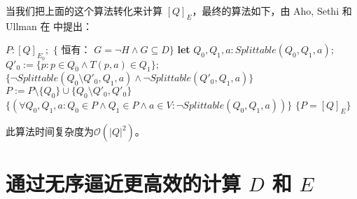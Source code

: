 当我们把上面的这个算法转化来计算 $[Q]_E$，最终的算法如下，由 Aho, Sethi 和 Ullman 在 \cite[Alg.3.6]{ASU86} 中提出：
\begin{algorithm}
    \caption{}\label{al:4-4}
    \begin{algorithmic}[1]
        \State $P:[Q]_{E_0};$ 
        \State $\{$ 恒有： $G= \neg H \land G \subseteq D \} $
            \State \textbf{let} $Q_0,Q_1,a:Splittable(Q_0,Q_1,a);$
            \State  $Q'_0 := \{ p:p\in Q_0 \land T(p,a) \in Q_1 \};$
            \State  $\{ \neg Splittable (Q_0 \setminus Q'_0 ,Q_1 ,a ) \land \neg Splittable (Q'_0,Q_1,a) \}$
            \State  $P := P \setminus \{Q_0\} \cup \{Q_0 \setminus Q'_0,Q'_0 \}$
        \Until 
        \State $ \{ (\forall Q_0,Q_1,a : Q_0 \in P \land Q_1 \in P \land a \in V : \neg Splittable (Q_0,Q_1,a))  \} $
        \State $\{  P = [Q]_E \}$
    \end{algorithmic}
\end{algorithm}
此算法时间复杂度为$\mathcal{O}(|Q|^2)$。

\section{通过无序逼近更高效的计算 $D$ 和 $E$}

